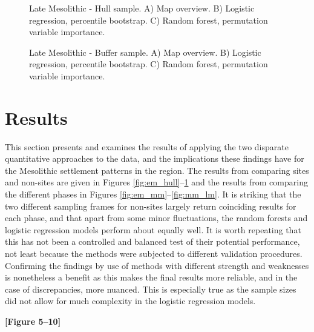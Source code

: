 \documentclass[12pt, a4paper]{article}
\begin{document}
\begin{figure}
	\caption[Late Mesolithic - Hull sample]{Late Mesolithic - Hull sample. A) Map overview. B) Logistic regression, percentile bootstrap. C) Random forest, permutation variable importance.}
	\label{fig:lm_hull}
\bigbreak
	\caption[Late Mesolithic - Buffer sample]{Late Mesolithic - Buffer sample. A) Map overview. B) Logistic regression, percentile bootstrap. C) Random forest, permutation variable importance.}
	\label{fig:lm_buff}
\end{figure}

\section{Results}
This section presents and examines the results of applying the two disparate quantitative approaches to the data, and the implications these findings have for the Mesolithic settlement patterns in the region. The results from comparing sites and non-sites are given in Figures \ref{fig:em_hull}--\ref{fig:lm_buff} and the results from comparing the different phases in Figures \ref{fig:em_mm}--\ref{fig:mm_lm}. It is striking that the two different sampling frames for non-sites largely return coinciding results for each phase, and that apart from some minor fluctuations, the random forests and logistic regression models perform about equally well. It is worth repeating that this has not been a controlled and balanced test of their potential performance, not least because the methods were subjected to different validation procedures. Confirming the findings by use of methods with different strength and weaknesses is nonetheless a benefit as this makes the final results more reliable, and in the case of discrepancies, more nuanced. This is especially true as the sample sizes did not allow for much complexity in the logistic regression models.\par

\smallskip
\textbf{[Figure 5--10]}
\smallskip
\end{document}
